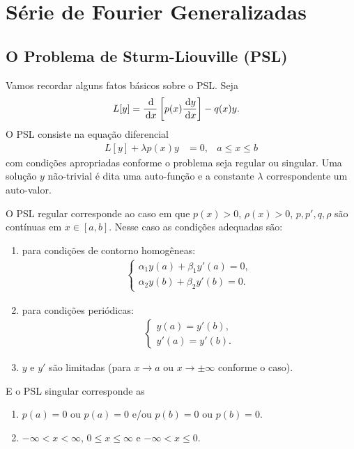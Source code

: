 \chapter{Série de Fourier Generalizadas}
\section{O Problema de Sturm-Liouville (PSL)}
Vamos recordar alguns fatos básicos sobre o PSL. Seja
\begin{align*}
    L[y] &= \frac{\, \mathrm{d}}{\, \mathrm{d}x}\left[ p(x) \frac{\, \mathrm{d}y}{\, \mathrm{d}x} \right] - q(x) y.
\end{align*}
O PSL consiste na equação diferencial
\begin{align*}
    L[y] + \lambda p(x) y &= 0, & a \leq x \leq b
\end{align*}
com condições apropriadas conforme o problema seja regular ou singular. Uma solução $y$ não-trivial é dita uma auto-função e a constante $\lambda$ correspondente um auto-valor.

O PSL regular corresponde ao caso em que $p(x) > 0$, $\rho(x) > 0$, $p, p', q, \rho$ são contínuas em $x \in [a,b]$. Nesse caso as condições adequadas são:
\begin{enumerate}
    \item para condições de contorno homogêneas:
        \begin{align*}
            \begin{cases}
                \alpha_1 y(a) + \beta_1 y'(a) = 0, \\
                \alpha_2 y(b) + \beta_2 y'(b) = 0.
            \end{cases}
        \end{align*}
    \item para condições periódicas:
        \begin{align*}
            \begin{cases}
                y(a) = y'(b), \\
                y'(a) = y'(b).
            \end{cases}
        \end{align*}
    \item $y$ e $y'$ são limitadas (para $x \to a$ ou $x \to \pm \infty$ conforme o caso).
\end{enumerate}

E o PSL singular corresponde as
\begin{enumerate}
    \item $p(a) = 0$ ou $p(a) = 0$ e/ou $p(b) = 0$ ou $p(b) = 0$.
    \item $-\infty < x < \infty$, $0 \leq x \leq \infty$ e $-\infty < x \leq 0$.
\end{enumerate}

